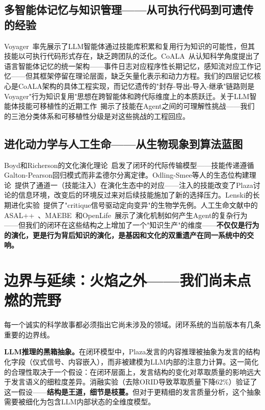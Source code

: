 \documentclass[twocolumn,10.5pt]{ctexart}
\begin{document}
\subsection{多智能体记忆与知识管理——从可执行代码到可遗传的经验}

Voyager~\cite{wang2023voyager}率先展示了LLM智能体通过技能库积累和复用行为知识的可能性，但其技能以可执行代码形式存在，缺乏跨团队的泛化。CoALA~\cite{sumers2023coala}从认知科学角度提出了语言智能体记忆的统一架构——事件日志对应程序性长期记忆，感知流对应工作记忆——但其框架停留在理论层面，缺乏矢量化表示和动力方程。我们的四层记忆核心是CoALA架构的具体工程实现，而记忆遗传的"封存-导出-导入-继承"链路则是Voyager"行为知识复用"思想在跨智能体和跨代际维度上的本质跃迁。关于LLM智能体技能可移植性的近期工作~\cite{skill_pseudocode2025,skill_comprehension2025}揭示了技能在Agent之间的可理解性挑战——我们的三池分类体系和可移植性分级是对这些挑战的工程回应。

\subsection{进化动力学与人工生命——从生物现象到算法蓝图}

Boyd和Richerson的文化演化理论~\cite{boyd1985culture}启发了闭环的代际传输模型——技能传递遵循Galton-Pearson回归模式而非孟德尔分离定律。Odling-Smee等人的生态位构建理论~\cite{odling2003niche}提供了通道一（技能注入）在演化生态中的对应——注入的技能改变了Plaza讨论的信息环境，改变后的环境反过来对后续技能施加了新的选择压力。Lenski的长期进化实验~\cite{lenski2003evolutionary}提供了"critique信号驱动定向变异"的生物学先例。人工生命文献中的ASAL++~\cite{asal2025}、MAEBE~\cite{maebe2025}和OpenLife~\cite{openlife2026}展示了演化机制如何产生Agent的复杂行为——但我们的闭环在这些结构之上增加了一个"知识生产"的维度——\textbf{不仅仅是行为的演化，更是行为背后知识的演化，是基因和文化的双重遗产在同一系统中的交响。}

\section{边界与延续：火焰之外——我们尚未点燃的荒野}

每一个诚实的科学故事都必须指出它尚未涉及的领域。闭环系统的当前版本有几条重要的边界线。

\textbf{LLM推理的黑箱抽象。}在闭环模型中，Plaza发言的内容推理被抽象为发言的结构化字段（仪式信号、内容嵌入），而非被建模为LLM内部的注意力计算。这一简化的合理性取决于一个假设：在闭环层面上，发言结构的变化对萃取质量的影响远大于发言语义的细粒度差异。消融实验（去除ORID导致萃取质量下降62\%）验证了这一假设——\textbf{结构是王道，细节是枝蔓。}但对于更精细的发言质量分析，这个抽象需要被细化为包含LLM内部状态的全维度模型。
\end{document}
